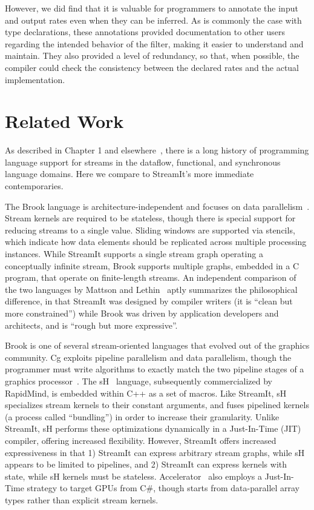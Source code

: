   However, we did find that it is valuable for programmers to annotate
  the input and output rates even when they can be inferred.  As is
  commonly the case with type declarations, these annotations provided
  documentation to other users regarding the intended behavior of the
  filter, making it easier to understand and maintain.  They also
  provided a level of redundancy, so that, when possible, the compiler
  could check the consistency between the declared rates and the
  actual implementation.

\myend

\section{Related Work}
\label{sec:lang-related}

As described in Chapter 1 and elsewhere~\cite{stephens_survey_1997},
there is a long history of programming language support for streams in
the dataflow, functional, and synchronous language domains.  Here we
compare to StreamIt's more immediate contemporaries.

The Brook language is architecture-independent and focuses on data
parallelism~\cite{brook04}.  Stream kernels are required to be
stateless, though there is special support for reducing streams to a
single value.  Sliding windows are supported via stencils, which
indicate how data elements should be replicated across multiple
processing instances.  While StreamIt supports a single stream graph
operating a conceptually infinite stream, Brook supports multiple
graphs, embedded in a C program, that operate on finite-length
streams.  An independent comparison of the two languages by Mattson
and Lethin~\cite{mattson_streaming_2003} aptly summarizes the
philosophical difference, in that StreamIt was designed by compiler
writers (it is ``clean but more constrained'') while Brook was driven
by application developers and architects, and is ``rough but more
expressive''.

Brook is one of several stream-oriented languages that evolved out of
the graphics community. Cg exploits pipeline parallelism and data
parallelism, though the programmer must write algorithms to exactly
match the two pipeline stages of a graphics processor~\cite{cg03}.
The sH~\cite{mccool_shader_2004,mccool_shader_2002} language,
subsequently commercialized by RapidMind, is embedded within C++ as a
set of macros.  Like StreamIt, sH specializes stream kernels to their
constant arguments, and fuses pipelined kernels (a process called
``bundling'') in order to increase their granularity.  Unlike
StreamIt, sH performs these optimizations dynamically in a
Just-In-Time (JIT) compiler, offering increased flexibility.  However,
StreamIt offers increased expressiveness in that 1) StreamIt can
express arbitrary stream graphs, while sH appears to be limited to
pipelines, and 2) StreamIt can express kernels with state, while sH
kernels must be stateless.
Accelerator~\cite{tarditi_accelerator_2006} also employs a
Just-In-Time strategy to target GPUs from C\#, though starts from
data-parallel array types rather than explicit stream kernels.

